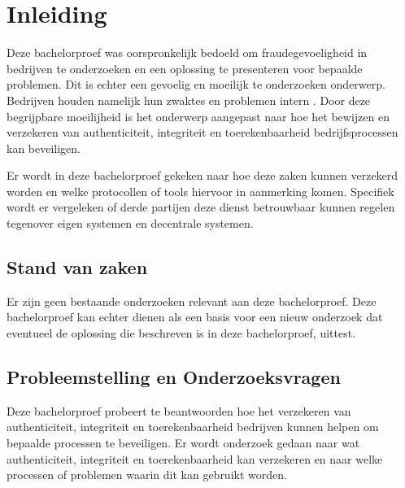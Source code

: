 
\chapter{Inleiding}
\label{ch:inleiding}

Deze bachelorproef was oorspronkelijk bedoeld om fraudegevoeligheid in bedrijven
te onderzoeken en een oplossing te presenteren voor bepaalde problemen. Dit is
echter een gevoelig en moeilijk te onderzoeken onderwerp. Bedrijven houden
namelijk hun zwaktes en problemen intern \autocite{EconomicCrimeSurvey}. Door
deze begrijpbare moeilijheid is het onderwerp aangepast naar hoe het bewijzen en
verzekeren van \gls{authenticiteit}, \gls{integriteit} en \gls{toerekenbaarheid}
bedrijfsprocessen
kan beveiligen.

Er wordt in deze bachelorproef gekeken naar hoe deze zaken kunnen verzekerd
worden en welke protocollen of tools hiervoor in aanmerking komen. Specifiek
wordt er vergeleken of derde partijen deze dienst betrouwbaar kunnen regelen
tegenover eigen systemen en decentrale systemen.

\section{Stand van zaken}
\label{sec:stand-van-zaken}
Er zijn geen bestaande onderzoeken relevant aan deze bachelorproef. Deze
bachelorproef kan echter dienen als een basis voor een nieuw onderzoek dat
eventueel de oplossing die beschreven is in deze bachelorproef, uittest.



\section{Probleemstelling en Onderzoeksvragen}
\label{sec:onderzoeksvragen}

Deze bachelorproef probeert te beantwoorden hoe het verzekeren van
\gls{authenticiteit}, \gls{integriteit} en \gls{toerekenbaarheid} bedrijven
kunnen helpen om
bepaalde processen te beveiligen. Er wordt onderzoek gedaan naar wat
\gls{authenticiteit}, \gls{integriteit} en \gls{toerekenbaarheid} kan verzekeren
en naar welke
processen of problemen waarin dit kan gebruikt worden.

